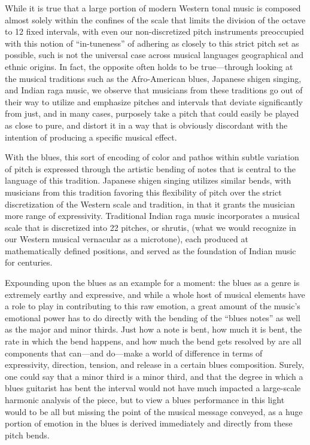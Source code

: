 While it is true that a large portion of modern Western tonal music is
composed almost solely within the confines of the scale that limits the
division of the octave to 12 fixed intervals, with even our
non-discretized pitch instruments preoccupied with this notion of
``in-tuneness'' of adhering as closely to this strict pitch set as
possible, such is not the universal case across musical languages
geographical and ethnic origins. In fact, the opposite often holds to be
true---through looking at the musical traditions such as the
Afro-American blues, Japanese shigen singing, and Indian raga music, we
observe that musicians from these traditions go out of their way to
utilize and emphasize pitches and intervals that deviate significantly
from just, and in many cases, purposely take a pitch that could easily
be played as close to pure, and distort it in a way that is obviously
discordant with the intention of producing a specific musical effect.

With the blues, this sort of encoding of color and pathos within subtle
variation of pitch is expressed through the artistic bending of notes
that is central to the language of this tradition. Japanese shigen
singing utilizes similar bends, with musicians from this tradition
favoring this flexibility of pitch over the strict discretization of the
Western scale and tradition, in that it grants the musician more range
of expressivity. Traditional Indian raga music incorporates a musical
scale that is discretized into 22 pitches, or shrutis, (what we would
recognize in our Western musical vernacular as a microtone), each
produced at mathematically defined positions, and served as the
foundation of Indian music for centuries.

Expounding upon the blues as an example for a moment: the blues as a
genre is extremely earthy and expressive, and while a whole host of
musical elements have a role to play in contributing to this raw
emotion, a great amount of the music's emotional power has to do
directly with the bending of the ``blues notes'' as well as the major
and minor thirds. Just how a note is bent, how much it is bent, the rate
in which the bend happens, and how much the bend gets resolved by are
all components that can---and do---make a world of difference in terms
of expressivity, direction, tension, and release in a certain blues
composition. Surely, one could say that a minor third is a minor third,
and that the degree in which a blues guitarist has bent the interval
would not have much impacted a large-scale harmonic analysis of the
piece, but to view a blues performance in this light would to be all but
missing the point of the musical message conveyed, as a huge portion of
emotion in the blues is derived immediately and directly from these
pitch bends.

